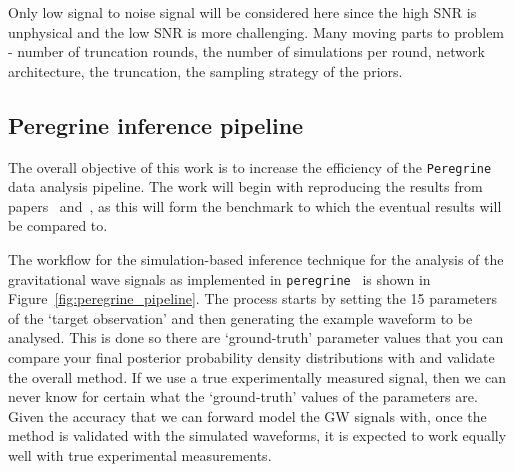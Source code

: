 Only low signal to noise signal will be considered here since the high SNR is unphysical and the low SNR is more challenging. Many moving parts to problem - number of truncation rounds, the number of simulations per round, network architecture, the truncation, the sampling strategy of the priors.

\subsection{Peregrine inference pipeline}

The overall objective of this work is to increase the efficiency of the \texttt{Peregrine} data analysis pipeline. The work will begin with reproducing the results from papers~\cite{bhardwaj2023peregrine} and~\cite{alvey2023things}, as this will form the benchmark to which the eventual results will be compared to.

The workflow for the simulation-based inference technique for the analysis of the gravitational wave signals as implemented in \texttt{peregrine}~\cite{bhardwaj2023peregrine} is shown in Figure~\ref{fig:peregrine_pipeline}. The process starts by setting the 15 parameters of the `target observation' and then generating the example waveform to be analysed. This is done so there are `ground-truth' parameter values that you can compare your final posterior probability density distributions with and validate the overall method. If we use a true experimentally measured signal, then we can never know for certain what the `ground-truth' values of the parameters are. Given the accuracy that we can forward model the GW signals with, once the method is validated with the simulated waveforms, it is expected to work equally well with true experimental measurements.

